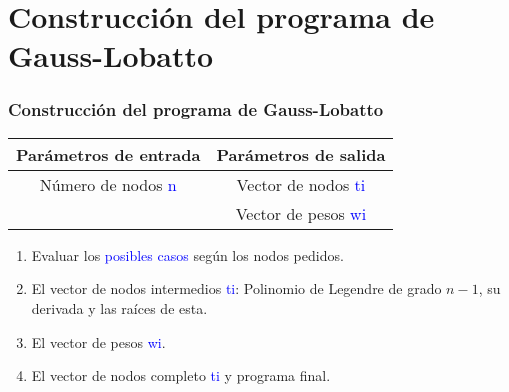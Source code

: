 \documentclass{beamer}
\begin{document}
\section{Construcción del programa de Gauss-Lobatto}
\begin{frame}
\frametitle{Construcción del programa de Gauss-Lobatto}

\begin{table}
    \centering
    \begin{tabular}{cc}
    \toprule
   \textbf{Parámetros de entrada} & \textbf{Parámetros de salida} \\
   \midrule
    Número de nodos \textcolor{blue}{n} & Vector de nodos \textcolor{blue}{ti}\\
         & Vector de pesos \textcolor{blue}{wi}\\
    \bottomrule
    \end{tabular}

    \label{tab:my_label}
\end{table}
\begin{enumerate}
\item Evaluar los \textcolor{blue}{posibles casos} según los nodos pedidos.
\item El vector de nodos intermedios \textcolor{blue}{ti}: Polinomio de Legendre de grado $n-1$, su derivada y las raíces de esta.
\item El vector de pesos \textcolor{blue}{wi}.
\item El vector de nodos completo \textcolor{blue}{ti} y programa final.
\end{enumerate}
\end{frame}


\end{document}
